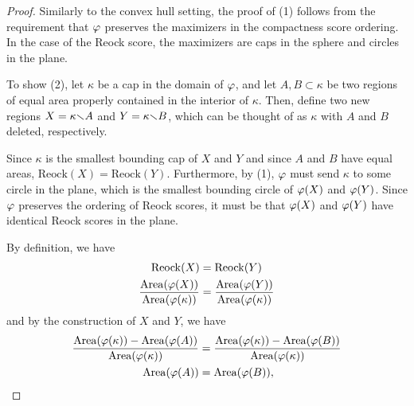 \begin{proof}
  Similarly to the convex hull setting, the proof of (1) follows from
  the requirement that $\varphi$ preserves the maximizers in the
  compactness score ordering.  In the case of the Reock score, the
  maximizers are caps in the sphere and circles in the plane.  

  To show (2), let $\kappa$ be a cap in the domain of $\varphi$, and let 
  $A,B\subset \kappa$ be two regions of equal area properly 
  contained in the interior of $\kappa$. Then, define two new regions
  $X=\kappa{\smallsetminus} A$ and $Y=\kappa{\smallsetminus} B$, which can be thought of as
  $\kappa$ with $A$ and $B$ deleted, respectively. 

  Since $\kappa$ is the smallest bounding cap of $X$ and $Y$ and since
  $A$ and $B$ have equal areas, $\mathrm{Reock}(X)=\mathrm{Reock}(Y)$.
  Furthermore, by (1), $\varphi$ must send $\kappa$ to some circle in
  the plane, which is the smallest bounding circle of $\varphi(X)$ and
  $\varphi(Y)$.    
  Since $\varphi$ preserves the ordering of Reock scores, it must be
  that $\varphi(X)$ and $\varphi(Y)$ have identical Reock scores in the
  plane.

  By definition, we have
  \begin{align*}
    \mathrm{Reock}(X) &= \mathrm{Reock}(Y)\\
    \frac{\mathrm{Area}(\varphi(X))}{\mathrm{Area}(\varphi(\kappa))} &= \frac{\mathrm{Area}(\varphi(Y))}{\mathrm{Area}(\varphi(\kappa))}
  \end{align*}
  and by the construction of $X$ and $Y$, we have 
  \begin{align*}
    \frac{\mathrm{Area}(\varphi(\kappa))
    - \mathrm{Area}(\varphi(A))}{\mathrm{Area}(\varphi(\kappa))} &=
    \frac{\mathrm{Area}(\varphi(\kappa))
    - \mathrm{Area}(\varphi(B))}{\mathrm{Area}(\varphi(\kappa))}\\
    \mathrm{Area}(\varphi(A)) &= \mathrm{Area}(\varphi(B)),
  \end{align*}


\end{proof}
